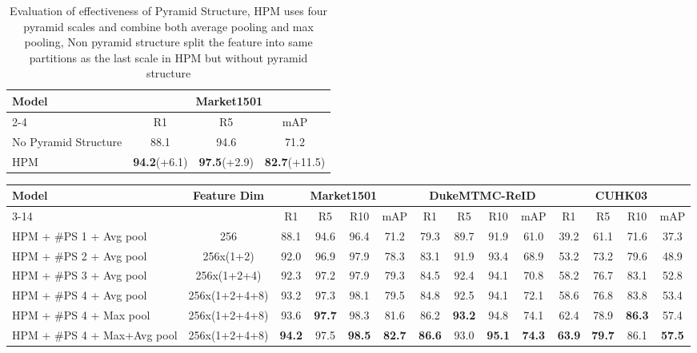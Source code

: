 \documentclass[letterpaper]{article} \usepackage{aaai19}  \usepackage{times}  \usepackage{helvet}  \usepackage{courier}  \usepackage{url}  \usepackage{graphicx}  \frenchspacing  \setlength{\pdfpagewidth}{8.5in}  \setlength{\pdfpageheight}{11in}  \usepackage{multirow}
\begin{document}
\begin{table}\setlength{\tabcolsep}{2pt}
\centering
\begin{tabular}{l|c|c|c}
\hline
\multirow{2}{*}{Model}  &  \multicolumn{3}{c}{Market1501}  \\ \cline{2-4}
& R1 & R5 & mAP  \\ \hline
No Pyramid Structure & 88.1 & 94.6 & 71.2 \\ \hline
HPM  & {\bf 94.2}(+6.1) & {\bf 97.5}(+2.9) & {\bf 82.7}(+11.5) \\ \hline 
\end{tabular}
\caption{Evaluation of effectiveness of Pyramid Structure, HPM uses four pyramid scales and combine both average pooling and max pooling, Non pyramid structure split the feature into same partitions as the last scale in HPM but without pyramid structure}
\label{exp:ab2}
\end{table}

\begin{table*}[t]\setlength{\tabcolsep}{3pt}
\centering
\begin{tabular}{l|c|c|c|c|c|c|c|c|c|c|c|c|c}
\hline
\multirow{2}{*}{Model} & \multirow{2}{*}{Feature Dim} &  \multicolumn{4}{c}{Market1501}  & \multicolumn{4}{|c}{DukeMTMC-ReID} & \multicolumn{4}{|c}{CUHK03}  \\ \cline{3-14}
& & R1 & R5 & R10 & mAP & R1 & R5 &R10 & mAP & R1 & R5 & R10 & mAP \\ \hline
HPM + \#PS 1 + Avg pool & 256 &88.1 & 94.6 & 96.4 & 71.2 & 79.3 & 89.7 & 91.9  & 61.0 & 39.2 & 61.1 & 71.6 & 37.3 \\ \hline
HPM + \#PS 2 + Avg pool & 256x(1+2) & 92.0 & 96.9 & 97.9 & 78.3 & 83.1 & 91.9 & 93.4 & 68.9 & 53.2 & 73.2 & 79.6 & 48.9 \\ \hline
HPM + \#PS 3 + Avg pool & 256x(1+2+4) &92.3 & 97.2 & 97.9 & 79.3 & 84.5 & 92.4 & 94.1 & 70.8& 58.2 & 76.7 &  83.1 & 52.8 \\ \hline
HPM + \#PS 4 + Avg pool &256x(1+2+4+8)& 93.2 & 97.3 & 98.1 & 79.5 & 84.8 & 92.5 & 94.1 & 72.1 & 58.6 & 76.8 & 83.8 & 53.4 \\ \hline
HPM + \#PS 4 + Max pool &256x(1+2+4+8)& 93.6 & {\bf 97.7} & 98.3 & 81.6 & 86.2 & {\bf 93.2} & 94.8 & 74.1 & 62.4 & 78.9 & {\bf 86.3} & 57.4 \\ \hline
HPM + \#PS 4 + Max+Avg pool & 256x(1+2+4+8) & {\bf 94.2} & 97.5 & {\bf 98.5} & {\bf 82.7} & {\bf 86.6} & 93.0 & {\bf 95.1} & {\bf 74.3} & {\bf 63.9} & {\bf 79.7} & 86.1 & {\bf 57.5} \\ \hline
\end{tabular}
\caption{Performance comparison of the proposed method with different pyramid scales and different pooling strategies as described in Section3.4. PS is the abbreviation of Pyramid Scales.}
\vspace{-5mm}
\label{exp:ab1}
\end{table*}
\end{document}
